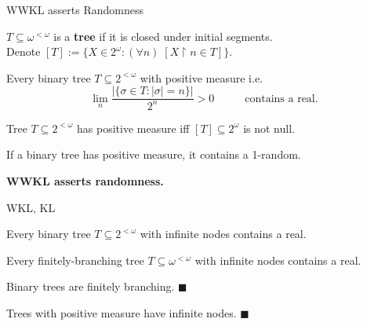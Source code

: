 \begin{frame}{WWKL asserts Randomness}
  \begin{notation*}
    $T\subseteq\omega^{<\omega}$ is a \textbf{tree} if it is closed under
    initial segments.\\
    Denote $[T]:= \{X\in2^\omega: (\forall n)\; [X\restriction n \in T]\}$.
  \end{notation*}
  \pause

  \begin{thm*}
    Every binary tree $T\subseteq 2^{<\omega}$ with positive measure i.e.
    \[\lim_n \frac{|\{\sigma\in T: |\sigma|=n\}|}{2^n}
    >0\;\;\;\;\;\;\;\;\;\;
    \text{contains a real.}\]
  \end{thm*}
  \pause

  \begin{fact}
    Tree $T\subseteq2^{<\omega}$ has positive measure iff
    $[T]\subseteq2^\omega$ is not null.
  \end{fact}
  \pause

  \begin{coro}
    If a binary tree has positive measure, it contains a 1-random.
  \end{coro}

  \pause
  \textbf{WWKL asserts randomness.}
\end{frame}

\begin{frame}{WKL, KL}
  \begin{thm*}
    Every binary tree $T\subseteq2^{<\omega}$ with infinite nodes contains
    a real.
  \end{thm*}

  \pause
  \begin{thm*}
    Every finitely-branching tree $T\subseteq\omega^{<\omega}$ with
    infinite nodes contains a real.
  \end{thm*}

  \pause
  \begin{observe*}
    Binary trees are finitely branching. $\blacksquare$
  \end{observe*}

  \pause
  \begin{observe*}
    Trees with positive measure have infinite nodes. $\blacksquare$
  \end{observe*}
\end{frame}

